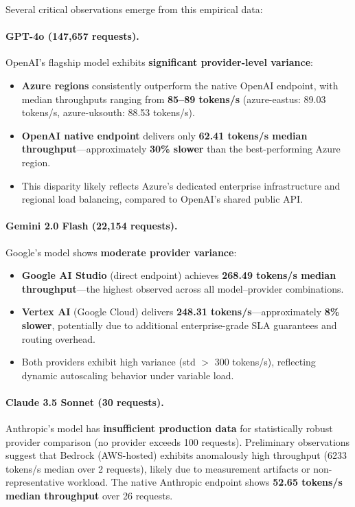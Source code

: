 \documentclass[english]{article}
\begin{document}
Several critical observations emerge from this empirical data:

\paragraph{GPT-4o (147,657 requests).} OpenAI's flagship model exhibits \textbf{significant provider-level variance}:
\begin{itemize}
    \item \textbf{Azure regions} consistently outperform the native OpenAI endpoint, with median throughputs ranging from \textbf{85--89 tokens/s} (azure-eastus: 89.03 tokens/s, azure-uksouth: 88.53 tokens/s).
    \item \textbf{OpenAI native endpoint} delivers only \textbf{62.41 tokens/s median throughput}—approximately \textbf{30\% slower} than the best-performing Azure region.
    \item This disparity likely reflects Azure's dedicated enterprise infrastructure and regional load balancing, compared to OpenAI's shared public API.
\end{itemize}

\paragraph{Gemini 2.0 Flash (22,154 requests).} Google's model shows \textbf{moderate provider variance}:
\begin{itemize}
    \item \textbf{Google AI Studio} (direct endpoint) achieves \textbf{268.49 tokens/s median throughput}—the highest observed across all model–provider combinations.
    \item \textbf{Vertex AI} (Google Cloud) delivers \textbf{248.31 tokens/s}—approximately \textbf{8\% slower}, potentially due to additional enterprise-grade SLA guarantees and routing overhead.
    \item Both providers exhibit high variance (std $>$ 300 tokens/s), reflecting dynamic autoscaling behavior under variable load.
\end{itemize}

\paragraph{Claude 3.5 Sonnet (30 requests).} Anthropic's model has \textbf{insufficient production data} for statistically robust provider comparison (no provider exceeds 100 requests). Preliminary observations suggest that Bedrock (AWS-hosted) exhibits anomalously high throughput (6233 tokens/s median over 2 requests), likely due to measurement artifacts or non-representative workload. The native Anthropic endpoint shows \textbf{52.65 tokens/s median throughput} over 26 requests.
\end{document}
